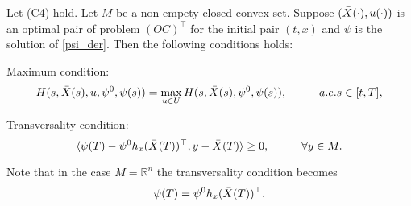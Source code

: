 \begin{theorem}
    Let (C4) hold. Let $M$ be a non-empety closed convex set. Suppose 
    $(\Bar{X}(\cdot), \Bar{u}(\cdot))$ is an optimal pair of problem $(OC)^\top$ 
    for the initial pair $(t,x)$ and $\psi$ is the solution of \cref{psi_der}. 
    Then the following conditions holds:
    \begin{asparaenum}[\bf{(}\bf{P}-1\bf{)}]
        \item Maximum condition:
        \begin{equation*}
            H(s, \Bar{X}(s), \Bar{u}, \psi^{0}, \psi(s)) = %
            \max_{u \in U} H(s, \Bar{X}(s), \psi^{0}, \psi(s)), \hspace{1cm}%
                a.e. s \in [t,T],
        \end{equation*}
        \item Transversality condition:
        \begin{equation*}
            \langle \psi(T) - \psi^{0}h_x (\Bar{X}(T))^\top, y -\Bar{X}(T)\rangle %
            \geq 0, \hspace{1cm} \forall y \in M.
        \end{equation*}
    \end{asparaenum}
\end{theorem}
\begin{remark}
    Note that in the case $M = \mathbb{R}^{n}$ the transversality condition becomes
    $$
        \psi(T) = \psi^{0}h_x (\Bar{X}(T))^\top.
    $$
\end{remark}
